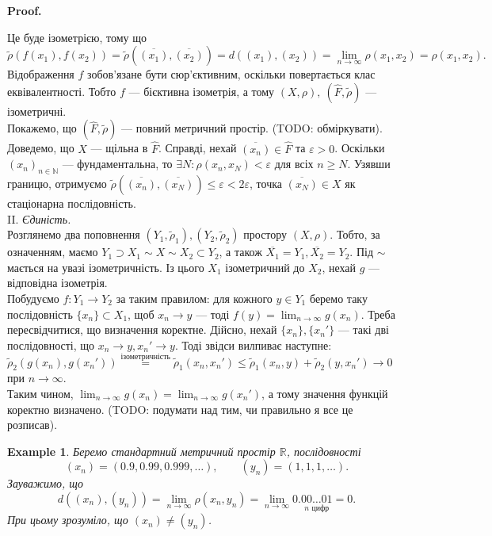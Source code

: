 \documentclass[a4paper, 10pt]{article}
\makeatletter
\theoremstyle{theoremdd}
\theoremstyle{theoremdd}
\theoremstyle{theoremdd}
\theoremstyle{theoremdd}
\newtheorem{example}[theorem]{Example}
\theoremstyle{theoremdd}
\theoremstyle{theoremdd}
\theoremstyle{theoremdd}
\theoremstyle{theoremdd}
\renewenvironment{proof}[1][Proof.\\]{\par
\pushQED{\hfill \qed}%
\normalfont \topsep6\p@\@plus6\p@\relax
\trivlist
\item\relax
{\bfseries
#1\@addpunct{.}}\hspace\labelsep\ignorespaces
}{%
\popQED\endtrivlist\@endpefalse
}
\makeatother
\begin{document}
\begin{proof}
Це буде ізометрією, тому що
\[
\tilde{\rho}(f(x_1),f(x_2)) = \tilde{\rho}( \overline{(x_1)},\overline{(x_2)} ) = d( (x_1), (x_2) ) = \displaystyle \lim_{n \to \infty} \rho(x_1,x_2) = \rho(x_1,x_2).
\]
Відображення $f$ зобов'язане бути сюр'єктивним, оскільки повертається клас еквівалентності. Тобто $f$ --- бієктивна ізометрія, а тому $(X,\rho),\ (\hat{F},\tilde{\rho})$ --- ізометричні.\\
Покажемо, що $(\hat{F},\tilde{\rho})$ --- повний метричний простір. (TODO: обміркувати).\\
Доведемо, що $X$ --- щільна в $\hat{F}$. Справді, нехай $\overline{(x_n)} \in \hat{F}$ та $\varepsilon > 0$. Оскільки $(x_n)_{n \in \mathbb{N}}$ --- фундаментальна, то $\exists N: \rho(x_n,x_N) < \varepsilon$ для всіх $n \geq N$. Узявши границю, отримуємо $\tilde{\rho}(\overline{(x_n)},\overline{(x_N)}) \leq \varepsilon < 2 \varepsilon$, точка $\overline{(x_N)} \in X$ як стаціонарна послідовність.
\bigskip \\
II. \textit{Єдиність.}\\
Розглянемо два поповнення $(Y_1,\tilde{\rho}_1), (Y_2,\tilde{\rho}_2)$ простору $(X,\rho)$. Тобто, за означенням, маємо $Y_1 \supset X_1 \sim X \sim X_2 \subset Y_2$, а також $\overline{X_1} = Y_1, \overline{X_2} = Y_2$. Під $\sim$ мається на увазі ізометричність. Із цього $X_1$ ізометричний до $X_2$, нехай $g$ --- відповідна ізометрія.\\
Побудуємо $f \colon Y_1 \to Y_2$ за таким правилом: для кожного $y \in Y_1$ беремо таку послідовність $\{x_n\} \subset X_1$, щоб $x_n \to y$ --- тоді $f(y) = \displaystyle\lim_{n \to \infty} g(x_n)$. Треба пересвідчитися, що визначення коректне. Дійсно, нехай $\{x_n\}, \{x_n'\}$ --- такі дві послідовності, що $x_n \to y, x_n' \to y$. Тоді звідси вилпиває наступне:\\
$\tilde{\rho}_2 (g(x_n),g(x_n')) \overset{\text{ізометричність}}{=} \tilde{\rho}_1(x_n,x_n') \leq \tilde{\rho}_1(x_n,y) + \tilde{\rho}_2(y,x_n') \to 0$ при $n \to \infty$.\\
Таким чином, $\displaystyle\lim_{n \to \infty} g(x_n) = \lim_{n \to \infty} g(x_n')$, а тому значення функцій коректно визначено. (TODO: подумати над тим, чи правильно я все це розписав).
\end{proof}

\begin{example}
Беремо стандартний метричний простір $\mathbb{R}$, послідовності
\[
 (x_n) = (0.9, 0.99, 0.999, \dots), \qquad (y_n) = (1,1,1,\dots).
 \]
Зауважимо, що \[
d((x_n),(y_n)) = \lim_{n \to \infty} \rho(x_n,y_n) = \lim_{n \to \infty} 0.\underset{n \text{ цифр}}{00\dots 01} = 0.
\]
При цьому зрозуміло, що $(x_n) \neq (y_n)$.
\end{example}
\end{document}
